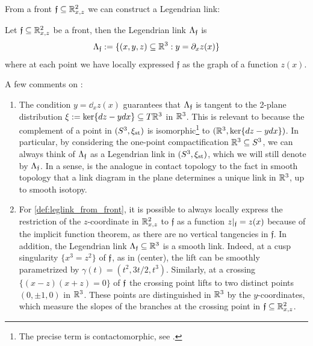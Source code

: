 \noindent From a front $\mathfrak{f}\subseteq \mathbb{R}^2_{x,z}$ we can construct a Legendrian link:

\begin{definition}\label{def:legendrian_link_from_front} Let $\mathfrak{f}\subseteq \mathbb{R}^2_{x,z}$ be a front, then the Legendrian link $\Lambda_\mathfrak{f}$ is
\begin{equation}\label{def:leglink_from_front}
\Lambda_\mathfrak{f}:=\{(x,y,z)\subseteq\mathbb{R}^3: y=\partial_x z(x)\}
\end{equation}
where at each point we have locally expressed $\mathfrak{f}$ as the graph of a function $z(x)$.\sbs
\end{definition}

\noindent A few comments on :

\begin{enumerate}
    \item The condition $y=\dd_x z(x)$ guarantees that $\Lambda_\mathfrak{f}$ is tangent to the 2-plane distribution $\xi:=\ker\{dz-ydx\}\subseteq T\mathbb{R}^3$ in $\mathbb{R}^3$. This is relevant to  because the complement of a point in $(S^3,\xi_{\text{st}})$ is isomorphic\footnote{The precise term is contactomorphic, see \cite[Chapter 2]{Geiges08}.} to $(\mathbb{R}^3,\ker\{dz-ydx\})$. In particular, by considering the one-point compactification $\mathbb{R}^3\subseteq S^3$, we can always think of $\Lambda_\mathfrak{f}$ as a Legendrian link in $(S^3,\xi_{\text{st}})$, which we will still denote by $\Lambda_{\mathfrak{f}}$. In a sense,  is the analogue in contact topology to the fact in smooth topology that a link diagram in the plane determines a unique link in $\mathbb{R}^3$, up to smooth isotopy.\\

    \item For \eqref{def:leglink_from_front}, it is possible to always locally express the restriction of the $z$-coordinate in $\mathbb{R}^2_{x,z}$ to $\mathfrak{f}$ as a function $z|_{\mathfrak{f}}=z(x)$ because of the implicit function theorem, as there are no vertical tangencies in $\mathfrak{f}$. In addition, the Legendrian link $\Lambda_{\mathfrak{f}}\subseteq\mathbb{R}^3$ is a smooth link. Indeed, at a cusp singularity $\{x^3=z^2\}$ of $\mathfrak{f}$, as in  (center), the lift can be smoothly parametrized by $\gamma(t)=(t^2,3t/2,t^3)$. Similarly, at a crossing $\{(x-z)(x+z)=0\}$ of $\mathfrak{f}$ the crossing point lifts to two distinct points $(0,\pm 1,0)$ in $\mathbb{R}^3$. These points are distinguished in $\mathbb{R}^3$ by the $y$-coordinates, which measure the slopes of the branches at the crossing point in $\mathfrak{f}\subseteq\mathbb{R}^2_{x,z}$.\\
\end{enumerate}

